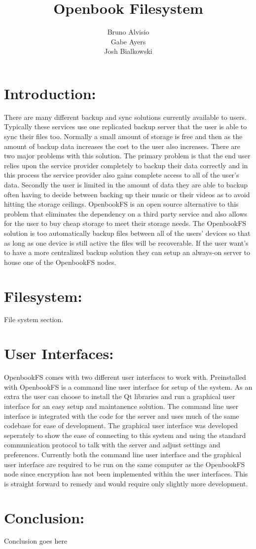 \documentclass[11pt]{report}
\title{Openbook Filesystem}
\author{Bruno Alvisio\\Gabe Ayers\\Josh Bialkowski}
\begin{document}
\maketitle
\section{Introduction:}
There are many different backup and sync solutions currently available to users. Typically these services use one replicated backup server that the user is able to sync their files too. Normally a small amount of storage is free and then as the amount of backup data increases the cost to the user also increases.  There are two major problems with this solution. The primary problem is that the end user relies upon the service provider completely to backup their data correctly and in this process the service provider also gains complete access to all of the user’s data. Secondly the user is limited in the amount of data they are able to backup often having to decide between backing up their music or their videos as to avoid hitting the storage ceilings.
OpenbookFS is an open source alternative to this problem that eliminates the dependency on a third party service and also allows for the user to buy cheap storage to meet their storage needs. The OpenbookFS solution is too automatically backup files between all of the users’ devices so that as long as one device is still active the files will be recoverable. If the user want’s to have a more centralized backup solution they can setup an always-on server to house one of the OpenbookFS nodes.

\section{Filesystem:}
File system section.

\section{User Interfaces:}
OpenbookFS comes with two different user interfaces to work with. Preinstalled with OpenbookFS is a command line user interface for setup of the system. As an extra the user can choose to install the Qt libraries and run a graphical user interface for an easy setup and maintanence solution. The command line user interface is integrated with the code for the server and uses much of the same codebase for ease of development. The graphical user interface was developed seperately to show the ease of connecting to this system and using the standard communication protocol to talk with the server and adjust settings and preferences. Currently both the command line user interface and the graphical user interface are required to be run on the same computer as the OpenbookFS node since encryption has not been implemented within the user interfaces. This is straight forward to remedy and would require only slightly more development.

\section{Conclusion:}
Conclusion goes here
\end{document}
